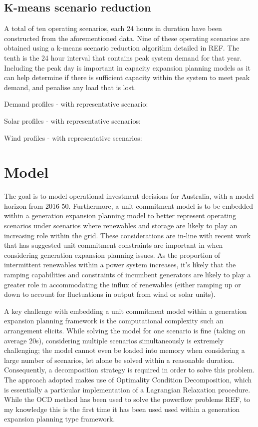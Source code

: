 \documentclass{article}
\begin{document}
\subsection{K-means scenario reduction}
A total of ten operating scenarios, each 24 hours in duration have been constructed from the aforementioned data. Nine of these operating scenarios are obtained using a k-means scenario reduction algorithm detailed in REF. The tenth is the 24 hour interval that contains peak system demand for that year. Including the peak day is important in capacity expansion planning models as it can help determine if there is sufficient capacity within the system to meet peak demand, and penalise any load that is lost.

Demand profiles - with representative scenario:

Solar profiles - with representative scenarios:

Wind profiles - with representative scenarios:

\section{Model}
The goal is to model operational investment decisions for Australia, with a model horizon from 2016-50. Furthermore, a unit commitment model is to be embedded within a generation expansion planning model to better represent operating scenarios under scenarios where renewables and storage are likely to play an increasing role within the grid. These considerations are in-line with recent work that has suggested unit commitment constraints are important in when considering generation expansion planning issues. As the proportion of intermittent renewables within a power system increases, it's likely that the ramping capabilities and constraints of incumbent generators are likely to play a greater role in accommodating the influx of renewables (either ramping up or down to account for fluctuations in output from wind or solar units). 

A key challenge with embedding a unit commitment model within a generation expansion planning framework is the computational complexity such an arrangement elicits. While solving the model for one scenario is fine (taking on average 20s), considering multiple scenarios simultaneously is extremely challenging; the model cannot even be loaded into memory when considering a large number of scenarios, let alone be solved within a reasonable duration. Consequently, a decomposition strategy is required in order to solve this problem. The approach adopted makes use of Optimality Condition Decomposition, which is essentially a particular implementation of a Lagrangian Relaxation procedure. While the OCD method has been used to solve the powerflow problems REF, to my knowledge this is the first time it has been used used within a generation expansion planning type framework.
\end{document}
